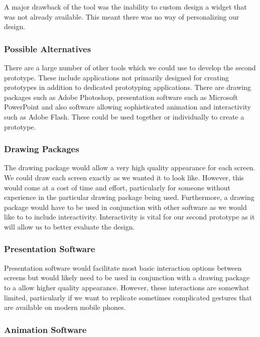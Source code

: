 A major drawback of the tool was the inability to custom design a widget that
was not already available.  This meant there was no way of personalizing our
design.

\subsubsection{Possible Alternatives}

There are a large number of other tools which we could use to develop the
second prototype. These include applications not primarily designed for
creating prototypes in addition to dedicated prototyping applications. There
are drawing packages such as Adobe Photoshop, presentation software such as
Microsoft PowerPoint and also software allowing sophisticated animation and
interactivity such as Adobe Flash. These could be used together or individually
to create a prototype.

\subsubsection{Drawing Packages}

The drawing package would allow a very high quality appearance for each screen.
We could draw each screen exactly as we wanted it to look like. However, this
would come at a cost of time and effort, particularly for someone without
experience in the particular drawing package being used. Furthermore, a drawing
package would have to be used in conjunction with other software as we would
like to to include interactivity. Interactivity is vital for our second
prototype as it will allow us to better evaluate the design.

\subsubsection{Presentation Software}

Presentation software would facilitate most basic interaction options between
screens but would likely need to be used in conjunction with a drawing package
to a allow higher quality appearance.  However, these interactions are somewhat
limited, particularly if we want to replicate sometimes complicated gestures
that are available on modern mobile phones.

\subsubsection{Animation Software}

